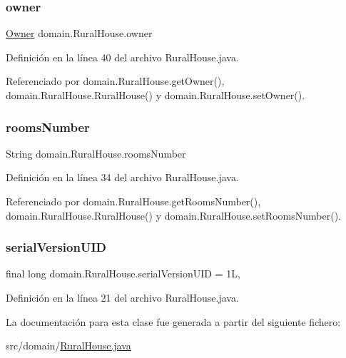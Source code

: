 \mbox{\label{classdomain_1_1_rural_house_ab7cf574fe34e0feacd2f748682163281}} 
\subsubsection{\texorpdfstring{owner}{owner}}
{\footnotesize\ttfamily \mbox{\hyperlink{classdomain_1_1_owner}{Owner}} domain.\+Rural\+House.\+owner\hspace{0.3cm}{\ttfamily [private]}}



Definición en la línea 40 del archivo Rural\+House.\+java.



Referenciado por domain.\+Rural\+House.\+get\+Owner(), domain.\+Rural\+House.\+Rural\+House() y domain.\+Rural\+House.\+set\+Owner().

\mbox{\label{classdomain_1_1_rural_house_a1cda0eff05ad06090ac37a259fdad562}} 
\subsubsection{\texorpdfstring{roomsNumber}{roomsNumber}}
{\footnotesize\ttfamily String domain.\+Rural\+House.\+rooms\+Number\hspace{0.3cm}{\ttfamily [private]}}



Definición en la línea 34 del archivo Rural\+House.\+java.



Referenciado por domain.\+Rural\+House.\+get\+Rooms\+Number(), domain.\+Rural\+House.\+Rural\+House() y domain.\+Rural\+House.\+set\+Rooms\+Number().

\mbox{\label{classdomain_1_1_rural_house_a985b2c72e90db2433da073e99c581cdc}} 
\subsubsection{\texorpdfstring{serialVersionUID}{serialVersionUID}}
{\footnotesize\ttfamily final long domain.\+Rural\+House.\+serial\+Version\+U\+ID = 1L\hspace{0.3cm}{\ttfamily [static]}, {\ttfamily [private]}}



Definición en la línea 21 del archivo Rural\+House.\+java.



La documentación para esta clase fue generada a partir del siguiente fichero\+:\begin{DoxyCompactItemize}
\item 
src/domain/\mbox{\hyperlink{_rural_house_8java}{Rural\+House.\+java}}\end{DoxyCompactItemize}
